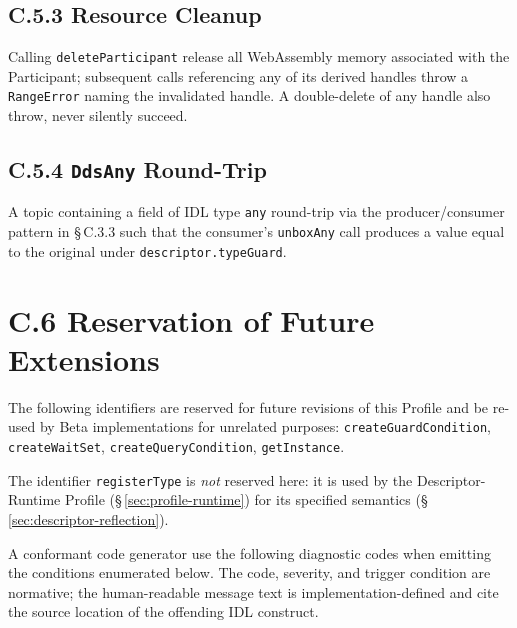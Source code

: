 \documentclass{../styles/zerodds-vendor-spec}
\begin{document}
\subsection*{C.5.3 Resource Cleanup}

Calling \texttt{deleteParticipant}  release all
WebAssembly memory associated with the Participant; subsequent
calls referencing any of its derived handles 
throw a \texttt{RangeError} naming the invalidated handle. A
double-delete of any handle  also throw, never
silently succeed.

\subsection*{C.5.4 \texttt{DdsAny} Round-Trip}

A topic containing a field of IDL type \texttt{any} 
round-trip via the producer/consumer pattern in \S\,C.3.3 such
that the consumer's \texttt{unboxAny} call produces a value
equal to the original under
\texttt{descriptor.typeGuard}.

\section*{C.6 Reservation of Future Extensions}

The following identifiers are reserved for future revisions of
this Profile and  be re-used by Beta
implementations for unrelated purposes:
\texttt{createGuardCondition},
\texttt{createWaitSet}, \texttt{createQueryCondition},
\texttt{getInstance}.

The identifier \texttt{registerType} is \emph{not} reserved here:
it is used by the Descriptor-Runtime Profile
(\S\,\ref{sec:profile-runtime}) for its specified semantics
(\S\,\ref{sec:descriptor-reflection}).

\label{annex:diagnostics}

A conformant code generator  use the following
diagnostic codes when emitting the conditions enumerated below.
The code, severity, and trigger condition are normative; the
human-readable message text is implementation-defined and
 cite the source location of the offending IDL
construct.
\end{document}
